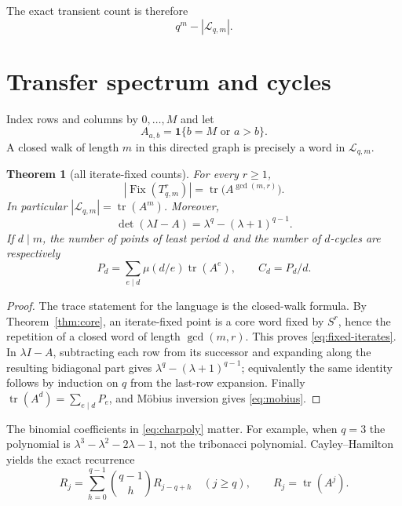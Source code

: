 \documentclass[a4paper,10pt]{amsart}
\newtheorem{theorem}{Theorem}[section]
\theoremstyle{remark}
\newcommand{\Lcal}{\mathcal L}
\newcommand{\Fix}{\operatorname{Fix}}
\begin{document}
The exact transient count is therefore
\begin{equation}\label{eq:transient-count}
 q^m-|\Lcal_{q,m}|.
\end{equation}

\section{Transfer spectrum and cycles}

Index rows and columns by $0,\ldots,M$ and let
\begin{equation}\label{eq:matrix}
 A_{a,b}=\mathbf1\{b=M\text{ or }a>b\}.
\end{equation}
A closed walk of length $m$ in this directed graph is precisely a word in
$\Lcal_{q,m}$.

\begin{theorem}[all iterate-fixed counts]\label{thm:spectrum}
For every $r\ge1$,
\begin{equation}\label{eq:fixed-iterates}
 |\Fix(T_{q,m}^r)|=\operatorname{tr}
 \bigl(A^{\gcd(m,r)}\bigr).
\end{equation}
In particular $|\Lcal_{q,m}|=\operatorname{tr}(A^m)$.  Moreover,
\begin{equation}\label{eq:charpoly}
 \det(\lambda I-A)=\lambda^q-(\lambda+1)^{q-1}.
\end{equation}
If $d\mid m$, the number of points of least period $d$ and the number of
$d$-cycles are respectively
\begin{equation}\label{eq:mobius}
 P_d=\sum_{e\mid d}\mu(d/e)\operatorname{tr}(A^e),
 \qquad C_d=P_d/d.
\end{equation}
\end{theorem}

\begin{proof}
The trace statement for the language is the closed-walk formula.  By
Theorem~\ref{thm:core}, an iterate-fixed point is a core word fixed by
$S^r$, hence the repetition of a closed word of length $\gcd(m,r)$.
This proves \eqref{eq:fixed-iterates}.  In $\lambda I-A$, subtracting each
row from its successor and expanding along the resulting bidiagonal part
gives
$\lambda^q-(\lambda+1)^{q-1}$; equivalently the same identity follows by
induction on $q$ from the last-row expansion.  Finally
$\operatorname{tr}(A^d)=\sum_{e\mid d}P_e$, and M\"obius inversion gives
\eqref{eq:mobius}.
\end{proof}

The binomial coefficients in \eqref{eq:charpoly} matter.  For example, when
$q=3$ the polynomial is $\lambda^3-\lambda^2-2\lambda-1$, not the
tribonacci polynomial.  Cayley--Hamilton yields the exact recurrence
\begin{equation}\label{eq:trace-recurrence}
 R_j=\sum_{h=0}^{q-1}\binom{q-1}{h}R_{j-q+h}
 \quad(j\ge q),\qquad R_j=\operatorname{tr}(A^j).
\end{equation}
\end{document}
